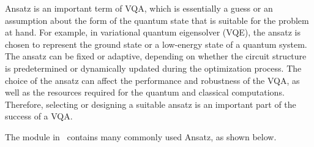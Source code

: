 Ansatz is an important term of VQA, which is essentially a guess or an assumption about the form of the quantum state that is suitable for the problem at hand. For example, in variational quantum eigensolver (VQE), the ansatz is chosen to represent the ground state or a low-energy state of a quantum system. The ansatz can be fixed or adaptive, depending on whether the circuit structure is predetermined or dynamically updated during the optimization process. The choice of the ansatz can affect the performance and robustness of the VQA, as well as the resources required for the quantum and classical computations. Therefore, selecting or designing a suitable ansatz is an important part of the success of a VQA.

The \nisq module in \MindQuantum \ contains many commonly used Ansatz, as shown below.

